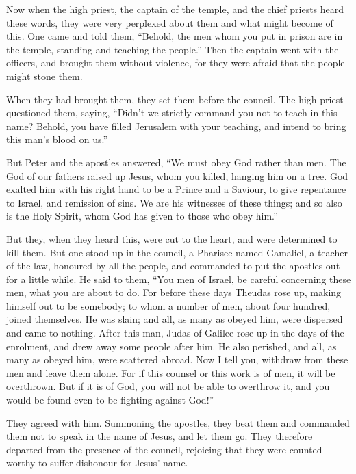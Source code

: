  Now when the high priest, the captain of the temple, and
the chief priests heard these words, they were very perplexed about them
and what might become of this.  One came and told them,
``Behold, the men whom you put in prison are in the temple, standing and
teaching the people.''  Then the captain went with the
officers, and brought them without violence, for they were afraid that
the people might stone them.

 When they had brought them, they set them before the
council. The high priest questioned them,  saying,
``Didn't we strictly command you not to teach in this name? Behold, you
have filled Jerusalem with your teaching, and intend to bring this man's
blood on us.''

 But Peter and the apostles answered, ``We must obey God
rather than men.  The God of our fathers raised up Jesus,
whom you killed, hanging him on a tree.  God exalted him
with his right hand to be a Prince and a Saviour, to give repentance to
Israel, and remission of sins.  We are his witnesses of
these things; and so also is the Holy Spirit, whom God has given to
those who obey him.''

 But they, when they heard this, were cut to the heart,
and were determined to kill them.  But one stood up in
the council, a Pharisee named Gamaliel, a teacher of the law, honoured
by all the people, and commanded to put the apostles out for a little
while.  He said to them, ``You men of Israel, be careful
concerning these men, what you are about to do.  For
before these days Theudas rose up, making himself out to be somebody; to
whom a number of men, about four hundred, joined themselves. He was
slain; and all, as many as obeyed him, were dispersed and came to
nothing.  After this man, Judas of Galilee rose up in the
days of the enrolment, and drew away some people after him. He also
perished, and all, as many as obeyed him, were scattered abroad.
 Now I tell you, withdraw from these men and leave them
alone. For if this counsel or this work is of men, it will be
overthrown.  But if it is of God, you will not be able to
overthrow it, and you would be found even to be fighting against God!''

 They agreed with him. Summoning the apostles, they beat
them and commanded them not to speak in the name of Jesus, and let them
go.  They therefore departed from the presence of the
council, rejoicing that they were counted worthy to suffer dishonour for
Jesus' name.

